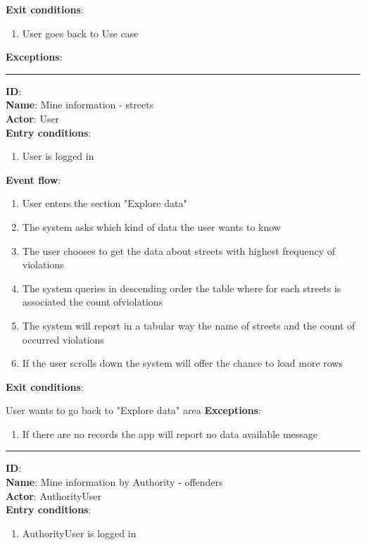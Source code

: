   \textbf{Exit conditions}:
  \begin{enumerate}
    \item{User goes back to Use case }
  \end{enumerate}
  \textbf{Exceptions}:
  \begin{enumerate}
  \end{enumerate}
  \rule{\linewidth}{0.4pt}
	\textbf{ID}:  \\
	\textbf{Name}: Mine information - streets \\
	\textbf{Actor}: User  \\
	\textbf{Entry conditions}:
	\begin{enumerate}
		\item{User is logged in}
	\end{enumerate}
	\textbf{Event flow}:
	\begin{enumerate}
		\item{User enters the section "Explore data"}
		\item{The system asks which kind of data the user wants to know}
    \item{The user chooses to get the data about streets with highest frequency of violations}
    \item{The system queries in descending order the table where for each streets is associated the count ofviolations }
    \item{The system will report in a tabular way the name of streets and the count of occurred violations}
    \item{If the user scrolls down the system will offer the chance to load more rows}
	\end{enumerate}
	\textbf{Exit conditions}:
        \item{User wants to go back to "Explore data" area}
	\textbf{Exceptions}:
  \begin{enumerate}
    \item{If there are no records the app will report no data available message}
  \end{enumerate}
	\rule{\linewidth}{0.4pt}
	\textbf{ID}:  \\
	\textbf{Name}: Mine information by Authority - offenders \\
	\textbf{Actor}: AuthorityUser   \\
	\textbf{Entry conditions}:
	\begin{enumerate}
		\item{AuthorityUser is logged in}
	\end{enumerate}
